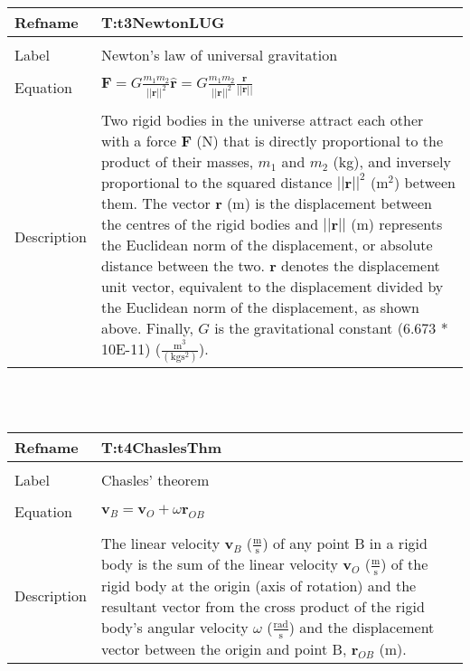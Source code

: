 \documentclass[12pt]{article}
\begin{document}
\noindent \begin{minipage}{\textwidth}
\begin{tabular}{p{} p{}}
\toprule \textbf{Refname} & \textbf{T:t3NewtonLUG}
\label{T:t3NewtonLUG}
\\ \midrule \\
Label & Newton's law of universal gravitation
\\ \midrule \\
Equation & $\mathbf{F}=G\frac{m_{1}m_{2}}{||\mathbf{r}||^{2}}\mathbf{\hat{r}}=G\frac{m_{1}m_{2}}{||\mathbf{r}||^{2}}\frac{\mathbf{r}}{||\mathbf{r}||}$
\\ \midrule \\
Description & Two rigid bodies in the universe attract each other with a force $\mathbf{F}$ (N) that is directly proportional to the product of their masses, $m_{1}$ and $m_{2}$ (kg), and inversely proportional to the squared distance $||\mathbf{r}||^{2}$ ($\text{m}^{2}$) between them. The vector $\mathbf{r}$ (m) is the displacement between the centres of the rigid bodies and $||\mathbf{r}||$ (m) represents the Euclidean norm of the displacement, or absolute distance between the two. $\mathbf{\hat{r}}$ denotes the displacement unit vector, equivalent to the displacement divided by the Euclidean norm of the displacement, as shown above. Finally, $G$ is the gravitational constant (6.673 * 10E-11) ($\frac{\text{m}^{3}}{(\text{kg}\text{s}^{2})}$).
\\ \bottomrule \end{tabular}
\end{minipage}\\
~\newline
\noindent \begin{minipage}{\textwidth}
\begin{tabular}{p{} p{}}
\toprule \textbf{Refname} & \textbf{T:t4ChaslesThm}
\label{T:t4ChaslesThm}
\\ \midrule \\
Label & Chasles' theorem
\\ \midrule \\
Equation & $\mathbf{v}_{B}=\mathbf{v}_{O}+\omega{}\mathbf{r}_{OB}$
\\ \midrule \\
Description & The linear velocity $\mathbf{v}_{B}$ ($\frac{\text{m}}{\text{s}}$) of any point B in a rigid body is the sum of the linear velocity $\mathbf{v}_{O}$ ($\frac{\text{m}}{\text{s}}$) of the rigid body at the origin (axis of rotation) and the resultant vector from the cross product of the rigid body's angular velocity $\omega{}$ ($\frac{\text{rad}}{\text{s}}$) and the displacement vector between the origin and point B, $\mathbf{r}_{OB}$ (m).
\\ \bottomrule \end{tabular}
\end{minipage}\\
\end{document}
